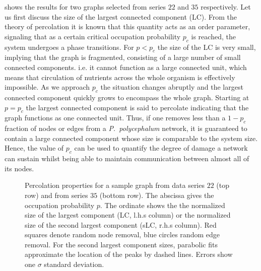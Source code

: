 		 shows the results for two graphs selected from series $22$ and $35$ respectively. Let us first discuss the size of the largest connected component (LC). From the theory of percolation it is known that this quantity acts as an order parameter, signaling that as a certain critical occupation probability $p_c$ is reached, the system undergoes a phase transitions. For $p < p_c$ the size of the LC is very small, implying that the graph is fragmented, consisting of a large number of small connected components. i.e. it cannot function as a large connected unit, which means that circulation of nutrients across the whole organism is effectively impossible. As we approach $p_c$ the situation changes abruptly and the largest connected component quickly grows to encompass the whole graph. Starting at $p=p_c$ the largest connected component is said to percolate indicating that the graph functions as one connected unit. Thus, if one removes less than a $1-p_c$ fraction of nodes or edges from a \emph{P.~polycephalum} network, it is guaranteed to contain a large connected component whose size is comparable to the system size. Hence, the value of $p_c$ can be used to quantify the degree of damage a network can sustain whilst being able to maintain communication between almost all of its nodes.

		\begin{figure}
			\centering
			\newline

			
			\caption[Percolation properties.]{Percolation properties for a sample graph from data series $22$ (top row) and from series $35$ (bottom row). The abscissa gives the occupation probability $p$. The ordinate shows the the normalized size of the largest component (LC, l.h.s column) or the normalized size of the second largest component (sLC, r.h.s column). Red squares denote random node removal, blue circles random edge removal. For the second largest component sizes, parabolic fits approximate the location of the peaks by dashed lines. Errors show one $\sigma$ standard deviation.}
			\label{fig:percolation_observables}
		\end{figure}

